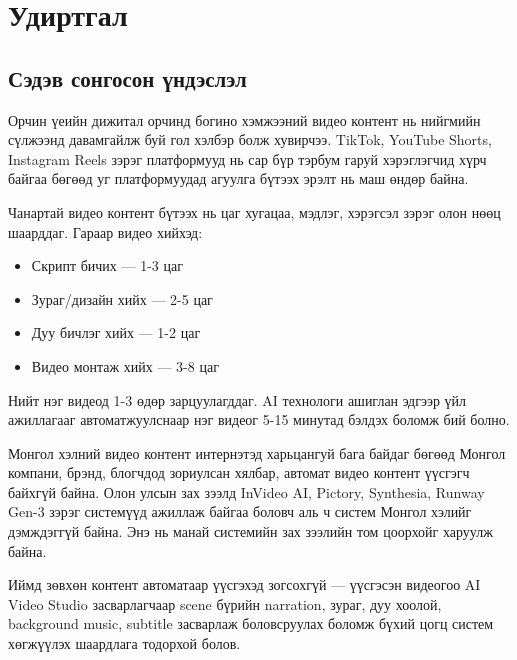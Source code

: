 
\chapter{Удиртгал}
\label{Chapter1}
\pagecolor{white}

\newcommand{\keyword}[1]{\textbf{#1}}
\newcommand{\tabhead}[1]{\textbf{#1}}
\newcommand{\code}[1]{\texttt{#1}}
\newcommand{\file}[1]{\texttt{\bfseries#1}}
\newcommand{\option}[1]{\texttt{\itshape#1}}

\section{Сэдэв сонгосон үндэслэл}

Орчин үеийн дижитал орчинд богино хэмжээний видео контент нь нийгмийн сүлжээнд давамгайлж буй гол хэлбэр болж хувирчээ. TikTok, YouTube Shorts, \mbox{Instagram} Reels зэрэг платформууд нь сар бүр тэрбум гаруй хэрэглэгчид хүрч байгаа бөгөөд уг платформуудад агуулга бүтээх эрэлт нь маш өндөр байна.

Чанартай видео контент бүтээх нь цаг хугацаа, мэдлэг, хэрэгсэл зэрэг олон нөөц шаарддаг. Гараар видео хийхэд:

\begin{itemize}
\item Скрипт бичих --- 1-3 цаг
\item Зураг/дизайн хийх --- 2-5 цаг
\item Дуу бичлэг хийх --- 1-2 цаг
\item Видео монтаж хийх --- 3-8 цаг
\end{itemize}

Нийт нэг видеод 1-3 өдөр зарцуулагддаг. AI технологи ашиглан эдгээр үйл ажиллагааг автоматжуулснаар нэг видеог 5-15 минутад бэлдэх боломж бий болно.

Монгол хэлний видео контент интернэтэд харьцангуй бага байдаг бөгөөд Монгол компани, брэнд, блогчдод зориулсан хялбар, автомат видео контент үүсгэгч байхгүй байна. Олон улсын зах зээлд InVideo AI, Pictory, Synthesia, Runway Gen-3 зэрэг системүүд ажиллаж байгаа боловч аль ч систем Монгол хэлийг дэмждэггүй байна. Энэ нь манай системийн зах зээлийн том цоорхойг харуулж байна.

Иймд зөвхөн контент автоматаар үүсгэхэд зогсохгүй --- үүсгэсэн видеогоо AI Video Studio засварлагчаар scene бүрийн narration, зураг, дуу хоолой, background music, subtitle засварлаж боловсруулах боломж бүхий цогц систем хөгжүүлэх шаардлага тодорхой болов.

